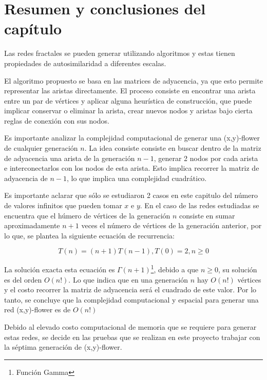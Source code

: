\section{Resumen y conclusiones del capítulo}

Las redes fractales se pueden generar utilizando algoritmos y estas tienen propiedades de autosimilaridad a diferentes escalas.

El algoritmo propuesto se basa en las matrices de adyacencia, ya que esto permite representar las aristas directamente. El proceso consiste en encontrar una arista entre un par de vértices y aplicar alguna heurística de construcción, que puede implicar conservar o eliminar la arista, crear nuevos nodos y aristas bajo cierta reglas de conexión con sus nodos.

Es importante analizar la complejidad computacional de generar una (x,y)-flower de cualquier generación $n$. La idea consiste consiste en buscar dentro de la matriz de adyacencia una arista de la generación $n-1$, generar 2 nodos por cada arista e interconectarlos con los nodos de esta arista. Esto implica recorrer la matriz de adyacencia de $n-1$, lo que implica una complejidad cuadrático.

Es importante aclarar que sólo se estudiaron 2 casos en este capitulo del número de valores infinitos que pueden tomar $x$ e $y$. En el caso de las redes estudiadas se encuentra que el húmero de vértices de la generación $n$ consiste en sumar aproximadamente $n+1$ veces el número de vértices de la generación anterior, por lo que, se plantea la siguiente ecuación de recurrencia:

\begin{equation}
    T(n)=(n+1)T(n-1), T(0)=2, n \geq 0
\end{equation}

La solución exacta esta ecuación es $\Gamma(n+1)$\footnote{Función Gamma}, debido a que $n\geq0$, su solución es del orden $O(n!)$. Lo que indica que en una generación $n$ hay $O(n!)$ vértices y el costo recorrer la matriz de adyacencia será el cuadrado de este valor. Por lo tanto, se concluye que la complejidad computacional y espacial para generar una red (x,y)-flower es de $O(n!)$

Debido al elevado costo computacional de memoria que se requiere para generar estas redes, se decide en las pruebas que se realizan en este proyecto trabajar con la séptima generación de (x,y)-flower.